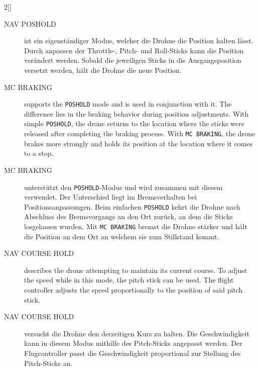 \begin{paracol}{2}[]
\colger

\begin{description}
	\item[NAV POSHOLD] ist ein eigenständiger Modus, welcher die Drohne die Position halten lässt. Durch anpassen der Throttle-, Pitch- und Roll-Sticks kann die Position verändert werden. Sobald die jeweiligen Sticks in die Ausgangsposition versetzt werden, hält die Drohne die neue Position.
\end{description}

\coleng

\begin{description}
	\item[MC BRAKING] supports the \texttt{POSHOLD} mode and is used in conjunction with it. The difference lies in the braking behavior during position adjustments. With simple \texttt{POSHOLD}, the drone returns to the location where the sticks were released after completing the braking process. With \texttt{MC BRAKING}, the drone brakes more strongly and holds its position at the location where it comes to a stop.
\end{description}

\colger

\begin{description}
	\item[MC BRAKING] unterstützt den \texttt{POSHOLD}-Modus und wird zusammen mit diesem verwendet. Der Unterschied liegt im Bremsverhalten bei Positionsanpassungen. Beim einfachen \texttt{POSHOLD} kehrt die Drohne nach Abschluss des Bremsvorgangs an den Ort zurück, an dem die Sticks losgelassen wurden. Mit \texttt{MC BRAKING} bremst die Drohne stärker und hält die Position an dem Ort an welchem sie zum Stillstand kommt.
\end{description}

\coleng

\begin{description}
	\item[NAV COURSE HOLD] describes the drone attempting to maintain its current course. To adjust the speed while in this mode, the pitch stick can be used. The flight controller adjusts the speed proportionally to the position of said pitch stick.
\end{description}

\colger

\begin{description}
	\item[NAV COURSE HOLD] versucht die Drohne den derzeitigen Kurs zu halten. Die Geschwindigkeit kann in diesem Modus mithilfe des Pitch-Sticks angepasst werden. Der Flugcontroller passt die Geschwindigkeit proportional zur Stellung des Pitch-Sticks an.
\end{description}


\end{paracol}
